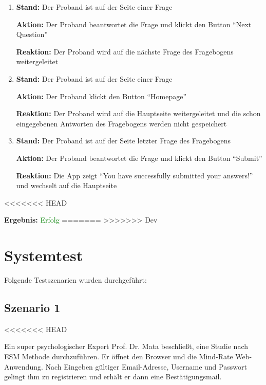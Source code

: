 \documentclass[a4paper]{scrreprt}
\begin{document}
\begin{itemize}
\begin{enumerate}
	        	        \item \par \textbf{Stand: }Der Proband ist auf der Seite einer Frage
	        	        \par \textbf{Aktion: }Der Proband beantwortet die Frage und klickt den Button ``Next Question''
	        	        \par \textbf{Reaktion: }Der Proband wird auf die nächste Frage des Fragebogens weitergeleitet
	        	        \item \par \textbf{Stand: }Der Proband ist auf der Seite einer Frage
	        	        \par \textbf{Aktion: }Der Proband klickt den Button ``Homepage''
	        	        \par \textbf{Reaktion: }Der Proband wird auf die Hauptseite weitergeleitet und die schon eingegebenen Antworten des Fragebogens werden nicht gespeichert
	        	        \item \par \textbf{Stand: }Der Proband ist auf der Seite letzter Frage des Fragebogens
	        	        \par \textbf{Aktion: }Der Proband beantwortet die Frage und klickt den Button ``Submit''
	        	        \par \textbf{Reaktion: }Die App zeigt ``You have successfully submitted your answers!'' und wechselt auf die Hauptseite
	              \end{enumerate}
<<<<<<< HEAD
                               \vspace*{0.3cm}
		      		           \par \textbf{Ergebnis: }\textcolor{green}{Erfolg}
		      		           \vspace*{0.6cm}
=======
>>>>>>> Dev

              \end{itemize}
	
	
	  \newpage
	  \chapter{Systemtest}
	  Folgende Testszenarien wurden durchgef\"uhrt:
	

		\section{Szenario 1}
<<<<<<< HEAD
                \par Ein super psychologischer Expert Prof. Dr. Mata beschließt, eine Studie nach ESM Methode durchzuf\"uhren. Er \"offnet den Browser und die Mind-Rate Web-Anwendung. Nach Eingeben g\"ultiger Email-Adresse, Username und Passwort gelingt ihm zu registrieren und erh\"alt er dann eine Bestätigungsmail.
\end{document}
